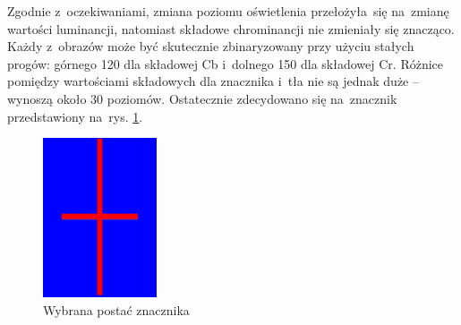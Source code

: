 Zgodnie z~oczekiwaniami, zmiana poziomu oświetlenia przełożyła~się na~zmianę wartości luminancji, natomiast składowe chrominancji nie zmieniały się znacząco. 
Każdy z~obrazów może być skutecznie zbinaryzowany przy użyciu stałych progów: górnego 120 dla składowej Cb i~dolnego 150 dla składowej Cr. 
Różnice pomiędzy wartościami składowych dla znacznika i~tła nie są jednak duże -- wynoszą około 30 poziomów. 
Ostatecznie zdecydowano się na~znacznik przedstawiony na~rys. \ref{fig:znacznik}.
\begin{figure}[h]
	\centering
	\includegraphics[width=0.3\textwidth]{znacznik.jpg}
	\caption{Wybrana postać znacznika}
	\label{fig:znacznik}
\end{figure}



